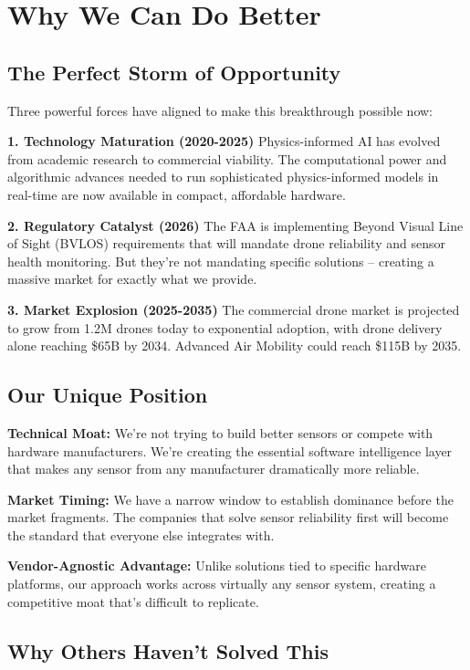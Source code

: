 \documentclass[11pt,letterpaper]{article}
\begin{document}
\section*{Why We Can Do Better}

\subsection*{The Perfect Storm of Opportunity}

Three powerful forces have aligned to make this breakthrough possible now:

\textbf{1. Technology Maturation (2020-2025)} Physics-informed AI has evolved from academic research to commercial viability. The computational power and algorithmic advances needed to run sophisticated physics-informed models in real-time are now available in compact, affordable hardware.

\textbf{2. Regulatory Catalyst (2026)} The FAA is implementing Beyond Visual Line of Sight (BVLOS) requirements that will mandate drone reliability and sensor health monitoring. But they're not mandating specific solutions – creating a massive market for exactly what we provide.

\textbf{3. Market Explosion (2025-2035)} The commercial drone market is projected to grow from 1.2M drones today to exponential adoption, with drone delivery alone reaching \$65B by 2034. Advanced Air Mobility could reach \$115B by 2035.

\subsection*{Our Unique Position}

\textbf{Technical Moat:} We're not trying to build better sensors or compete with hardware manufacturers. We're creating the essential software intelligence layer that makes any sensor from any manufacturer dramatically more reliable.

\textbf{Market Timing:} We have a narrow window to establish dominance before the market fragments. The companies that solve sensor reliability first will become the standard that everyone else integrates with.

\textbf{Vendor-Agnostic Advantage:} Unlike solutions tied to specific hardware platforms, our approach works across virtually any sensor system, creating a competitive moat that's difficult to replicate.

\subsection*{Why Others Haven't Solved This}
\end{document}
